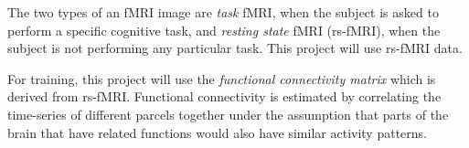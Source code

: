 The two types of an fMRI image are \textit{task} fMRI, when the subject is asked to perform a specific cognitive task, and \textit{resting state} fMRI (rs-fMRI), when the subject is not performing any particular task. This project will use rs-fMRI data.

For training, this project will use the \textit{functional connectivity matrix} which is derived from rs-fMRI. Functional connectivity is estimated by correlating the time-series of different parcels together under the assumption that parts of the brain that have related functions would also have similar activity patterns. 









